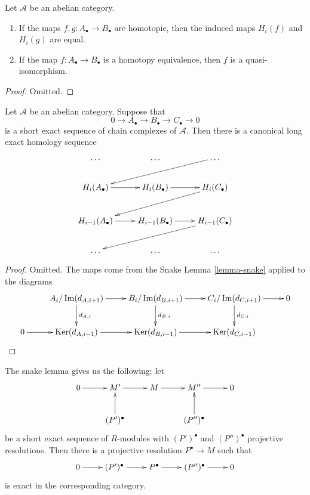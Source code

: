 \begin{lemma}
\label{lemma-map-homology-homotopy}
Let $\mathcal{A}$ be an abelian category.
\begin{enumerate}
\item If the maps $f, g : A_\bullet \to
B_\bullet$ are
homotopic, then the induced maps $H_i(f)$ and
$H_i(g)$
are equal.
\item If the map $f : A_\bullet \to
B_\bullet$ is a homotopy
equivalence, then $f$ is a quasi-isomorphism.
\end{enumerate}
\end{lemma}

\begin{proof}
Omitted.
\end{proof}

\begin{lemma}
\label{lemma-long-exact-sequence-chain}
Let $\mathcal{A}$ be an abelian category.
Suppose that
$$
0 \to
A_\bullet \to
B_\bullet \to
C_\bullet \to
0
$$
is a short exact sequence of chain complexes
of $\mathcal{A}$.
Then there is a canonical long exact homology
sequence
$$
\xymatrix{
\ldots & \ldots & \ldots \ar[lld] \\
H_i(A_\bullet) \ar[r] & H_i(B_\bullet) \ar[r]
& H_i(C_\bullet) \ar[lld] \\
H_{i - 1}(A_\bullet) \ar[r] &
H_{i - 1}(B_\bullet) \ar[r] &
H_{i - 1}(C_\bullet) \ar[lld] \\
\ldots & \ldots & \ldots \\
}
$$
\end{lemma}

\begin{proof}
Omitted. The maps come from the Snake Lemma
\ref{lemma-snake}
applied to the diagrams
$$
\xymatrix{
&
A_i/\Im(d_{A, i + 1}) \ar[r] \ar[d]^{d_{A,
i}} &
B_i/\Im(d_{B, i + 1}) \ar[r] \ar[d]^{d_{B,
i}} &
C_i/\Im(d_{C, i + 1}) \ar[r] \ar[d]^{d_{C,
i}} &
0 \\
0 \ar[r] &
\Ker(d_{A, i - 1}) \ar[r] &
\Ker(d_{B, i - 1}) \ar[r] &
\Ker(d_{C, i - 1}) &
}
$$
\end{proof}

\begin{remark}
\label{remark-snake-lemma-les}
The snake lemma gives us the following:
let 
$$
\xymatrix{
0\ar[r]
&M'\ar[r]
&M\ar[r]
&M''\ar[r]
&0\\
& (P')^\bullet\ar[u]
&& (P'')^\bullet \ar[u]
}
$$
be a short exact sequence of $R$-modules
with $(P')^\bullet$ and
$(P'')^\bullet$ projective
resolutions. Then there is a
projective resolution $P^\bullet \to M$
such that
$$
\xymatrix{
0\ar[r]
&(P')^\bullet\ar[r]
&P^\bullet\ar[r]
&(P'')^\bullet\ar[r]
&0
}
$$
is exact in the corresponding category.
\end{remark}

